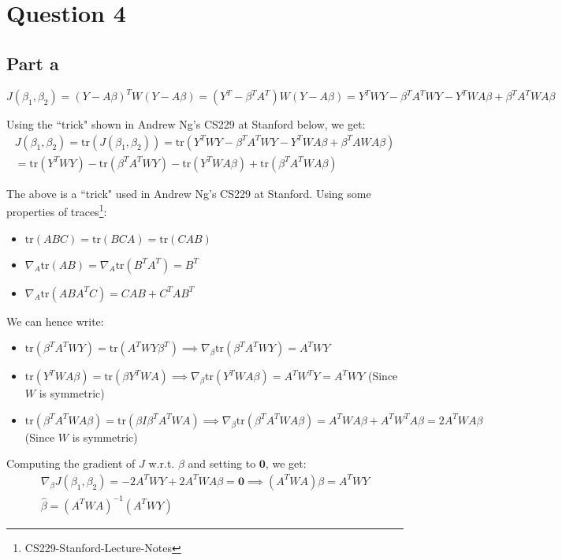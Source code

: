 \documentclass{article}
\newcommand{\tr}{\text{tr}}
\begin{document}
\section*{Question 4}
\subsection*{Part a}
\begin{flushleft}
\begin{equation}
J(\beta_{1}, \beta_{2}) = (Y - A\beta)^{T}W(Y - A\beta) = (Y^{T} - \beta^{T}A^{T})W(Y - A\beta) = Y^{T}WY - \beta^{T}A^{T}WY - Y^{T}WA\beta + \beta^{T}A^{T}WA\beta
\end{equation}

Using the ``trick" shown in Andrew Ng's CS229 at Stanford below, we get:
\begin{multline}
J(\beta_{1}, \beta_{2}) = \tr(J(\beta_{1}, \beta_{2})) = \tr(Y^{T}WY - \beta^{T}A^{T}WY - Y^{T}WA\beta + \beta^{T}AWA\beta) \\ = \tr(Y^{T}WY) - \tr(\beta^{T}A^{T}WY) - \tr(Y^{T}WA\beta) + \tr(\beta^{T}A^{T}WA\beta)
\end{multline}

The above is a ``trick" used in Andrew Ng's CS229 at Stanford. Using some properties of traces\footnote{CS229-Stanford-Lecture-Notes}:
\begin{itemize}
\item \(\tr(ABC) = \tr(BCA) = \tr(CAB)\)
\item \(\nabla_{A} \tr(AB) = \nabla_{A} \tr(B^TA^T) = B^{T}\)
\item \(\nabla_{A} \tr(ABA^{T}C) = CAB + C^{T}AB^{T}\)
\end{itemize}

We can hence write: 
\begin{itemize}
\item \(\tr(\beta^{T}A^{T}WY) = \tr(A^{T}WY\beta^{T}) \implies \nabla_{\beta} \tr(\beta^{T}A^{T}WY) = A^{T}WY\)
\item \(\tr(Y^{T}WA\beta) = \tr(\beta Y^{T}WA) \implies \nabla_{\beta} \tr(Y^{T}WA\beta) = A^{T}W^{T}Y = A^{T}WY\) (Since \(W\) is symmetric)
\item \(\tr(\beta^{T}A^{T}WA\beta) = \tr(\beta I \beta^{T}A^{T}WA) \implies \nabla_{\beta} \tr(\beta^{T}A^{T}WA\beta) = A^{T}WA\beta + A^{T}W^{T}A\beta = 2A^{T}WA\beta\) (Since \(W\) is symmetric)
\end{itemize}

Computing the gradient of \(J\) w.r.t. \(\beta\) and setting to \(\mathbf{0}\), we get:
\begin{gather}
\nabla_{\beta} J(\beta_{1}, \beta_{2}) = -2A^{T}WY + 2A^{T}WA\beta = \mathbf{0} \implies (A^{T}WA)\beta = A^{T}WY \\
\hat{\beta} = \boxed{(A^{T}WA)^{-1}(A^{T}WY)}
\end{gather}
\end{flushleft}
\end{document}
